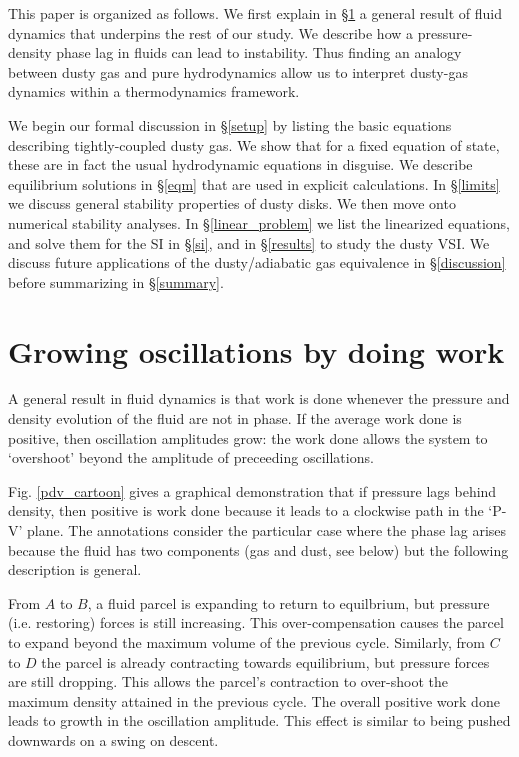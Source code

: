 \documentclass[iop, numberedappendix]{emulateapj}
\begin{document}
This paper is organized as follows. We first
explain in \S\ref{grow_osc} a general result of fluid dynamics that
underpins the rest of our study. We describe how 
a pressure-density phase lag in fluids can lead to 
instability. Thus finding an analogy between dusty gas and
pure hydrodynamics allow us to interpret dusty-gas dynamics
within a thermodynamics framework. 

We begin our formal discussion in \S\ref{setup} by listing the 
basic equations describing tightly-coupled dusty gas. We show that for a
fixed equation of state, these are in 
fact the usual hydrodynamic equations in disguise. 
We describe equilibrium solutions in \S\ref{eqm} that are used in
explicit calculations. In \S\ref{limits} we discuss 
general stability properties of dusty disks. We then move onto
numerical stability analyses. In  
\S\ref{linear_problem} we list the linearized equations, and solve 
them for the SI in \S\ref{si}, and in 
 \S\ref{results} to study the dusty VSI. We 
discuss future applications of the dusty/adiabatic gas equivalence in 
\S\ref{discussion} before summarizing in \S\ref{summary}. 




\section{Growing oscillations by doing work}\label{grow_osc}
A general result in fluid dynamics is that work is done whenever the
pressure and density evolution of the fluid are not in phase. If 
the average work done is positive, then oscillation amplitudes 
grow: the work done allows the system to `overshoot' beyond
the amplitude of preceeding oscillations. 


Fig. \ref{pdv_cartoon} gives a graphical demonstration that 
if pressure lags behind density, then positive is work done 
because it leads to a clockwise path in the 
`P-V' plane. The annotations consider the particular case where the
phase lag arises because the fluid has two components (gas and dust,
see below) but the following description is general. 

From $A$ to $B$, a fluid parcel is expanding to return to 
equilbrium, but pressure (i.e. restoring) forces is still 
increasing. This over-compensation causes the parcel to expand
beyond the maximum volume of the previous cycle. 
Similarly, from $C$ to $D$ the parcel is already contracting towards
equilibrium, but pressure 
forces are still dropping. This allows the  
parcel's contraction to over-shoot the maximum density attained in the
previous cycle. 
The overall positive work done leads to growth in the oscillation amplitude. 
This effect is similar to being pushed downwards on a swing on
descent. 
\end{document}
